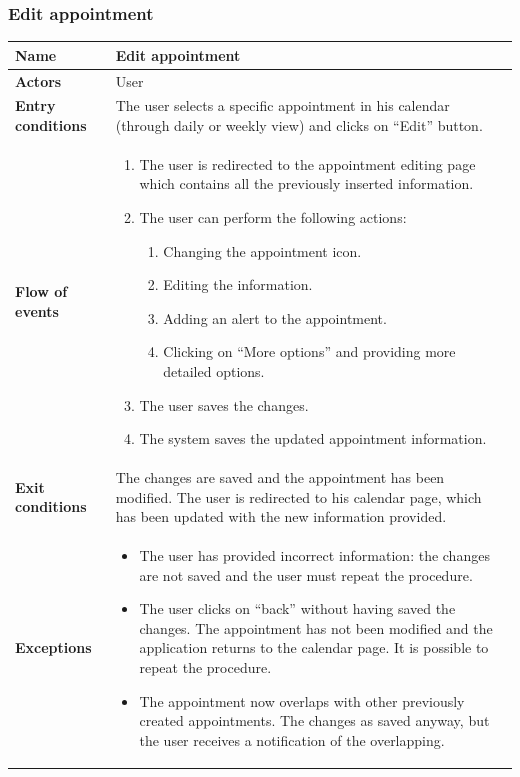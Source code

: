 \subsubsection{Edit appointment}
\begin{table}[!h]
	\centering
	{\renewcommand{\arraystretch}{2}%
		\begin{tabular}{|l|p{12cm}|}
			\hline
			\textbf{Name} 				& \textbf{Edit appointment} \\ \hline
			\textbf{Actors} 			& User \\ \hline
			\textbf{Entry conditions} 	& The user selects a specific appointment in his calendar (through daily or weekly view) and clicks on “Edit” button. \\ \hline
			\textbf{Flow of events}		& \begin{minipage}[t]{0.75\textwidth}
				\begin{enumerate}
					\item The user is redirected to the appointment editing page which contains all the previously inserted information.
					\item The user can perform the following actions:
					\begin{enumerate}
						\item Changing the appointment icon.
						\item Editing the information.
						\item Adding an alert to the appointment.
						\item Clicking on “More options” and providing more detailed options.
					\end{enumerate}
					\item The user saves the changes.
					\item The system saves the updated appointment information.
				\end{enumerate}
			\end{minipage}	\\ \hline
			\textbf{Exit conditions}	& The changes are saved and the appointment has been modified. The user is redirected to his calendar page, which has been updated with the new information provided.  \\ \hline
			\textbf{Exceptions}			& \begin{minipage}[t]{0.75\textwidth}
				\begin{itemize}
					\item The user has provided incorrect information: the changes are not saved and the user must repeat the procedure. 
					\item The user clicks on “back” without having saved the changes. The appointment has not been modified and the application returns to the calendar page. It is possible to repeat the procedure.
					\item The appointment now overlaps with other previously created appointments. The changes as saved anyway, but the user receives a notification of the overlapping.
				\end{itemize} 
			\end{minipage} \\ \hline
	\end{tabular}}
\end{table}
\clearpage

